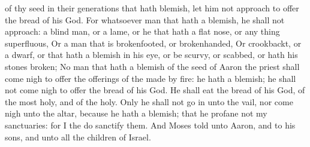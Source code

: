 {{} of thy
seed in their
generations that hath
{}
blemish, let him not
approach to
offer the
bread of his
God.
For whatsoever
man
{} that hath a
blemish, he shall not
approach: a
blind
man, or a
lame, or he that hath a flat
nose, or any thing
superfluous,
Or a
man that is
brokenfooted, or
brokenhanded,
Or
crookbackt, or a
dwarf, or that hath a
blemish in his
eye, or be
scurvy, or
scabbed, or hath his
stones
broken;
No
man that hath a
blemish of the
seed of
Aaron the
priest shall come
nigh to
offer the
offerings of the
{} made by
fire: he hath a
blemish; he shall not come
nigh to
offer the
bread of his
God.
He shall
eat the
bread of his
God,
{} of the
most
holy, and of the
holy.
Only he shall not go
in unto the
vail, nor come
nigh unto the
altar, because he hath a
blemish; that he
profane not my
sanctuaries: for I the
{} do
sanctify them.
And
Moses
told
{} unto
Aaron, and to his
sons, and unto all the
children of
Israel.

}
